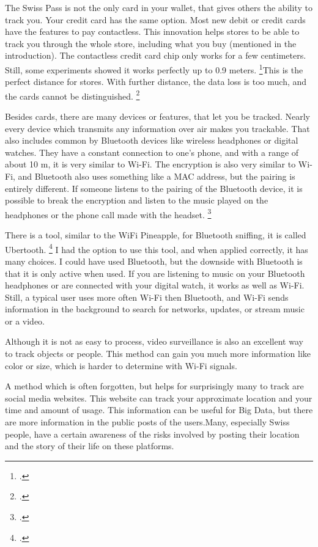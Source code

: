 \documentclass[paper=a4, fontsize=11pt]{article}
\begin{document}
The Swiss Pass is not the only card in your wallet, that gives others the ability to track you. Your credit card has the same option. Most new debit or credit cards have the features to pay contactless. This innovation helps stores to be able to track you through the whole store, including what you buy (mentioned in the introduction). The contactless credit card chip only works for a few centimeters. Still, some experiments showed it works perfectly up to 0.9 meters. \footcite{contactlesspaymentsppp}This is the perfect distance for stores. With further distance, the data loss is too much, and the cards cannot be distinguished.
\footcite{contactlesspaymentspaper} 

Besides cards, there are many devices or features, that let you be tracked. Nearly every device which transmits any information over air makes you trackable. That also includes common by Bluetooth devices like wireless headphones or digital watches. They have a constant connection to one's phone, and with a range of about 10 m, it is very similar to Wi-Fi. The encryption is also very similar to Wi-Fi, and Bluetooth also uses something like a MAC address, but the pairing is entirely different. If someone listens to the pairing of the Bluetooth device, it is possible to break the encryption and listen to the music played on the headphones or the phone call made with the headset. \footcite{ubertooth}

There is a tool, similar to the WiFi Pineapple, for Bluetooth sniffing, it is called Ubertooth. \footcite{ubertooth} I had the option to use this tool, and when applied correctly, it has many choices. I could have used Bluetooth, but the downside with Bluetooth is that it is only active when used. If you are listening to music on your Bluetooth headphones or are connected with your digital watch, it works as well as Wi-Fi. Still, a typical user uses more often Wi-Fi then Bluetooth, and Wi-Fi sends information in the background to search for networks, updates, or stream music or a video.

Although it is not as easy to process, video surveillance is also an excellent way to track objects or people. This method can gain you much more information like color or size, which is harder to determine with Wi-Fi signals.

A method which is often forgotten, but helps for surprisingly many to track are social media websites. This website can track your approximate location and your time and amount of usage. This information can be useful for Big Data, but there are more information in the public posts of the users.Many, especially Swiss people, have a certain awareness of the risks involved by posting their location and the story of their life on these platforms.
\end{document}
